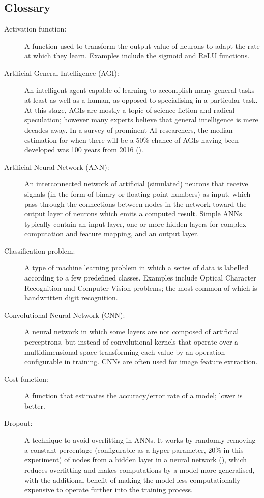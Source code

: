 \documentclass[]{report}
\begin{document}
\subsection{Glossary}
\begin{description}
\item[Activation function:] A function used to transform the output value of neurons to adapt the rate at which they learn. Examples include the sigmoid and ReLU functions.

\item[Artificial General Intelligence (AGI):] An intelligent agent capable of learning to accomplish many general tasks at least as well as a human, as opposed to specialising in a particular task. At this stage, AGIs are mostly a topic of science fiction and radical speculation; however many experts believe that general intelligence is mere decades away. In a survey of prominent AI researchers, the median estimation for when there will be a 50\% chance of AGIs having been developed was 100 years from 2016 (\cite{grace2017will}).

\item[Artificial Neural Network (ANN):] An interconnected network of artificial (simulated) neurons that receive signals (in the form of binary or floating point numbers) as input, which pass through the connections between nodes in the network toward the output layer of neurons which emits a computed result. Simple ANNs typically contain an input layer, one or more hidden layers for complex computation and feature mapping, and an output layer.

\item[Classification problem:] A type of machine learning problem in which a series of data is labelled according to a few predefined classes. Examples include Optical Character Recognition and Computer Vision problems; the most common of which is handwritten digit recognition.

\item[Convolutional Neural Network (CNN):] A neural network in which some layers are not composed of artificial perceptrons, but instead of convolutional kernels that operate over a multidimensional space transforming each value by an operation configurable in training. CNNs are often used for image feature extraction.

\item[Cost function:] A function that estimates the accuracy/error rate of a model; lower is better.

\item[Dropout:] A technique to avoid overfitting in ANNs. It works by randomly removing a constant percentage (configurable as a hyper-parameter, 20\% in this experiment) of nodes from a hidden layer in a neural network (\cite{dropout14}), which reduces overfitting and makes computations by a model more generalised, with the additional benefit of making the model less computationally expensive to operate further into the training process.


\end{description}
\end{document}
